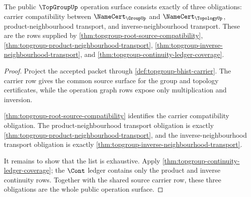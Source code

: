 \begin{theorem}
\label{thm:topgroup-product-inverse-obligation-triad}
The public $\TopGroupUp$ operation surface consists exactly of three
obligations: carrier compatibility between $\NameCert_{\GroupUp}$ and
$\NameCert_{\TopologyUp}$, product-neighbourhood transport, and
inverse-neighbourhood transport. These are the rows supplied by
\autoref{thm:topgroup-root-source-compatibility},
\autoref{thm:topgroup-product-neighbourhood-transport},
\autoref{thm:topgroup-inverse-neighbourhood-transport}, and
\autoref{thm:topgroup-continuity-ledger-coverage}.
\end{theorem}
\begin{proof}
Project the accepted packet through \autoref{def:topgroup-bhist-carrier}. The
carrier row gives the common source surface for the group and topology
certificates, while the operation graph rows expose only multiplication and
inversion.

\autoref{thm:topgroup-root-source-compatibility} identifies the carrier
compatibility obligation. The product-neighbourhood transport obligation is
exactly \autoref{thm:topgroup-product-neighbourhood-transport}, and the
inverse-neighbourhood transport obligation is exactly
\autoref{thm:topgroup-inverse-neighbourhood-transport}.

It remains to show that the list is exhaustive. Apply
\autoref{thm:topgroup-continuity-ledger-coverage}; the $\Cont$ ledger contains
only the product and inverse continuity rows. Together with the shared source
carrier row, these three obligations are the whole public operation surface.
\end{proof}

